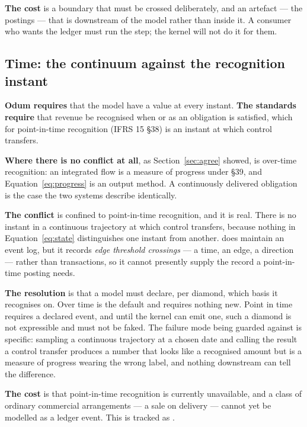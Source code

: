 \documentclass[11pt,a4paper]{article}
\begin{document}
\textbf{The cost} is a boundary that must be crossed deliberately, and an artefact --- the postings --- that is downstream of the model rather than inside it. A consumer who wants the ledger must run the step; the kernel will not do it for them.

\subsection{Time: the continuum against the recognition instant}

\textbf{Odum requires} that the model have a value at every instant. \textbf{The standards require} that revenue be recognised when or as an obligation is satisfied, which for point-in-time recognition (IFRS 15 \S38) is an instant at which control transfers.

\textbf{Where there is no conflict at all}, as Section~\ref{sec:agree} showed, is over-time recognition: an integrated flow is a measure of progress under \S39, and Equation~\eqref{eq:progress} is an output method. A continuously delivered obligation is the case the two systems describe identically.

\textbf{The conflict} is confined to point-in-time recognition, and it is real. There is no instant in a continuous trajectory at which control transfers, because nothing in Equation~\eqref{eq:state} distinguishes one instant from another. \gssk{} does maintain an event log, but it records \emph{edge threshold crossings} --- a time, an edge, a direction --- rather than transactions, so it cannot presently supply the record a point-in-time posting needs.

\textbf{The resolution} is that a model must declare, per diamond, which basis it recognises on. Over time is the default and requires nothing new. Point in time requires a declared event, and until the kernel can emit one, such a diamond is not expressible and must not be faked. The failure mode being guarded against is specific: sampling a continuous trajectory at a chosen date and calling the result a control transfer produces a number that looks like a recognised amount but is a measure of progress wearing the wrong label, and nothing downstream can tell the difference.

\textbf{The cost} is that point-in-time recognition is currently unavailable, and a class of ordinary commercial arrangements --- a sale on delivery --- cannot yet be modelled as a ledger event. This is tracked as .
\end{document}

